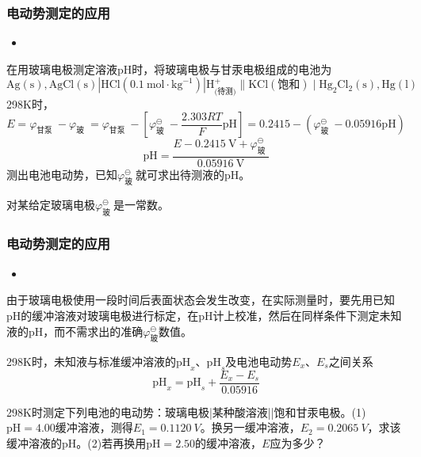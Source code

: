 \documentclass[dvipsnames, svgnames, x11names]{beamer}
\begin{document}
\begin{frame}[t]
    \frametitle{电动势测定的应用}
    \begin{itemize}
        \item[4.] 
    \end{itemize}
    在用玻璃电极测定溶液pH时，将玻璃电极与甘汞电极组成的电池为
    \[
        \mathrm{Ag}(\mathrm{s}), \mathrm{AgCl}(\mathrm{s})|\mathrm{HCl}(0.1 \mathrm{~mol} \cdot \mathrm{kg}^{-1})| \mathrm{H}_{\text{(待测)}}^{+} \| \mathrm{KCl}  (\text{饱和})  \mid \mathrm{Hg}_{2} \mathrm{Cl}_{2}(\mathrm{s}), \mathrm{Hg}(\mathrm{l}) 
    \]
    298K时，
    \[
        E=\varphi_{\text {甘泵 }}-\varphi_{\text {玻 }}= \varphi_{\text {甘泵 }}-[\varphi_{\text {玻 }}^\ominus - \frac{2.303RT}{F}\mathrm{pH}] =0.2415 -(\varphi_{\text {玻 }}^{\ominus}-0.05916 \mathrm{pH})
    \]
    \[
        \mathrm{pH}=\frac{E-0.2415 \mathrm{~V}+\varphi_{\text {玻 }}^{\ominus}}{0.05916 \mathrm{~V}}
    \]
    测出电池电动势，已知$\varphi_{\text {玻 }}^\ominus$就可求出待测液的pH。

    对某给定玻璃电极$\varphi_{\text {玻 }}^\ominus$是一常数。


\end{frame}


\begin{frame}[t]
    \frametitle{电动势测定的应用}
    \begin{itemize}
        \item[4.] 
    \end{itemize}
    由于玻璃电极使用一段时间后表面状态会发生改变，在实际测量时，要先用已知pH的缓冲溶液对玻璃电极进行标定，在pH计上校准，然后在同样条件下测定未知液的pH，而不需求出的准确$\varphi_{\text{玻}}^{\ominus}$数值。

    298K时，未知液与标准缓冲溶液的$\mathrm{pH}_x$、$\mathrm{pH}_s$及电池电动势$E_x$、$E_s$之间关系
    \[
        \mathrm{pH}_x = \mathrm{pH}_s + \frac{E_x - E_s}{0.05916}
    \]
    \begin{example}
        298K时测定下列电池的电动势：玻璃电极|某种酸溶液||饱和甘汞电极。(1)$\mathrm{pH}=4.00$缓冲溶液，测得$E_1=\SI{0.1120}{V}$。换另一缓冲溶液，$E_2=\SI{0.2065}{V}$，求该缓冲溶液的pH。(2)若再换用$\mathrm{pH}=2.50$的缓冲溶液，$E$应为多少？
    \end{example}
    
\end{frame}
\end{document}
